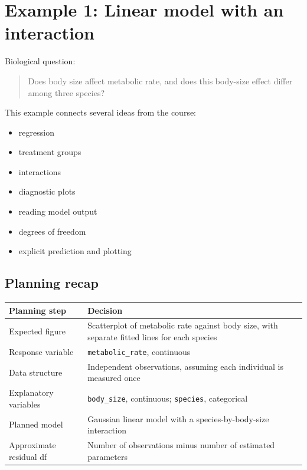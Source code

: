 \documentclass[
  letterpaper,
  8pt,
  a4paper]{book}
\newcounter{none} %
\providecommand{\tightlist}{%
  \setlength{\itemsep}{0pt}\setlength{\parskip}{0pt}}
\begin{document}
\section*{Example 1: Linear model with an
interaction}\label{example-1-linear-model-with-an-interaction}


Biological question:

\begin{quote}
Does body size affect metabolic rate, and does this body-size effect
differ among three species?
\end{quote}

This example connects several ideas from the course:

\begin{itemize}
\tightlist
\item
  regression
\item
  treatment groups
\item
  interactions
\item
  diagnostic plots
\item
  reading model output
\item
  degrees of freedom
\item
  explicit prediction and plotting
\end{itemize}

\subsection*{Planning recap}\label{planning-recap}

{\def\LTcaptype{none} %
\begin{longtable}[]{@{}
  >{\raggedright\arraybackslash}p{}
  >{\raggedright\arraybackslash}p{}@{}}
\toprule\noalign{}
\begin{minipage}[b]{\linewidth}\raggedright
Planning step
\end{minipage} & \begin{minipage}[b]{\linewidth}\raggedright
Decision
\end{minipage} \\
\midrule\noalign{}
\endhead
\bottomrule\noalign{}
\endlastfoot
Expected figure & Scatterplot of metabolic rate against body size, with
separate fitted lines for each species \\
Response variable & \texttt{metabolic\_rate}, continuous \\
Data structure & Independent observations, assuming each individual is
measured once \\
Explanatory variables & \texttt{body\_size}, continuous;
\texttt{species}, categorical \\
Planned model & Gaussian linear model with a species-by-body-size
interaction \\
Approximate residual df & Number of observations minus number of
estimated parameters \\
\end{longtable}
}
\end{document}
